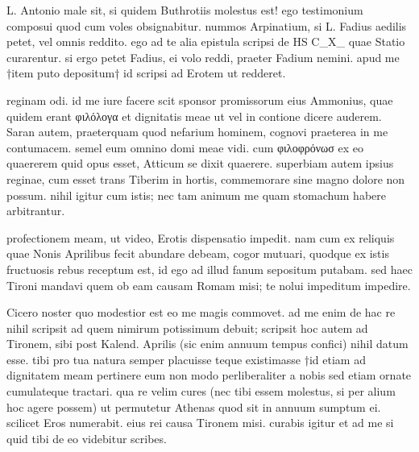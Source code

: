 


 L. Antonio male sit, si quidem Buthrotiis molestus est! ego testimonium composui quod cum voles obsignabitur. nummos Arpinatium, si L. Fadius aedilis petet, vel omnis reddito. ego ad te alia epistula scripsi de HS C_X_ quae Statio curarentur. si ergo petet Fadius, ei volo reddi, praeter Fadium nemini. apud me †item puto depositum† id scripsi ad Erotem ut redderet.

 reginam odi. id me iure facere scit sponsor promissorum eius Ammonius, quae quidem erant φιλόλογα et dignitatis meae ut vel in contione dicere auderem. Saran autem, praeterquam quod nefarium hominem, cognovi praeterea in me contumacem. semel eum omnino domi meae vidi. cum φιλοφρόνωσ ex eo quaererem quid opus esset, Atticum se dixit quaerere. superbiam autem ipsius reginae, cum esset trans Tiberim in hortis, commemorare sine magno dolore non possum. nihil igitur cum istis; nec tam animum me quam stomachum habere arbitrantur.

 profectionem meam, ut video, Erotis dispensatio impedit. nam cum ex reliquis quae Nonis Aprilibus fecit abundare debeam, cogor mutuari, quodque ex istis fructuosis rebus receptum est, id ego ad illud fanum sepositum putabam. sed haec Tironi mandavi quem ob eam causam Romam misi; te nolui impeditum impedire.

 Cicero noster quo modestior est eo me magis commovet. ad me enim de hac re nihil scripsit ad quem nimirum potissimum debuit; scripsit hoc autem ad Tironem, sibi post Kalend. Aprilis (sic enim annuum tempus confici) nihil datum esse. tibi pro tua natura semper placuisse teque existimasse †id etiam ad dignitatem meam pertinere eum non modo perliberaliter a nobis sed etiam ornate cumulateque tractari. qua re velim cures (nec tibi essem molestus, si per alium hoc agere possem) ut permutetur Athenas quod sit in annuum sumptum ei. scilicet Eros numerabit. eius rei causa Tironem misi. curabis igitur et ad me si quid tibi de eo videbitur scribes.
